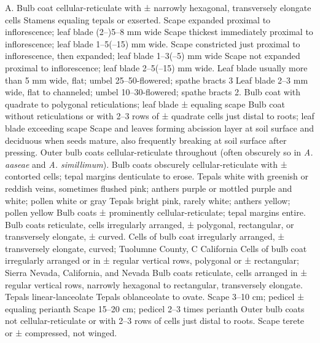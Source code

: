 \documentclass[a4paper]{article}
\begin{document}
\begin{Key}{A. }
\alter Bulb coat cellular-reticulate with ± narrowly hexagonal, transversely elongate cells
\alter Stamens equaling tepals or exserted.
\alter Scape expanded proximal to inflorescence; leaf blade (2--)5--8 mm wide
\alter Scape thickest immediately proximal to inflorescence; leaf blade 1--5(--15) mm wide.
\alter Scape constricted just proximal to inflorescence, then expanded; leaf blade 1--3(--5) mm wide
\alter Scape not expanded proximal to inflorescence; leaf blade 2--5(--15) mm wide.
\alter Leaf blade usually more than 5 mm wide, flat; umbel 25--50-flowered; spathe bracts 3
\alter Leaf blade 2--3 mm wide, flat to channeled; umbel 10--30-flowered; spathe bracts 2.
\alter Bulb coat with quadrate to polygonal reticulations; leaf blade ± equaling scape
\alter Bulb coat without reticulations or with 2--3 rows of ± quadrate cells just distal to roots; leaf blade exceeding scape
\alter Scape and leaves forming abcission layer at soil surface and deciduous when seeds mature, also frequently breaking at soil surface after pressing.
\alter Outer bulb coats cellular-reticulate throughout (often obscurely so in \textit{A. aaseae} and \textit{A. simillimum}).
\alter Bulb coats obscurely cellular-reticulate with ± contorted cells; tepal margins denticulate to erose.
\alter Tepals white with greenish or reddish veins, sometimes flushed pink; anthers purple or mottled purple and white; pollen white or gray
\alter Tepals bright pink, rarely white; anthers yellow; pollen yellow
\alter Bulb coats ± prominently cellular-reticulate; tepal margins entire.
\alter Bulb coats reticulate, cells irregularly arranged, ± polygonal, rectangular, or transversely elongate, ± curved.
\alter Cells of bulb coat irregularly arranged, ± transversely elongate, curved; Tuolumne County, C California
\alter Cells of bulb coat irregularly arranged or in ± regular vertical rows, polygonal or ± rectangular; Sierra Nevada, California, and Nevada
\alter Bulb coats reticulate, cells arranged in ± regular vertical rows, narrowly hexagonal to rectangular, transversely elongate.
\alter Tepals linear-lanceolate
\alter Tepals oblanceolate to ovate.
\alter Scape 3--10 cm; pedicel ± equaling perianth
\alter Scape 15--20 cm; pedicel 2--3 times perianth
\alter Outer bulb coats not cellular-reticulate or with 2--3 rows of cells just distal to roots.
\alter Scape terete or ± compressed, not winged.

\end{Key}
\end{document}
